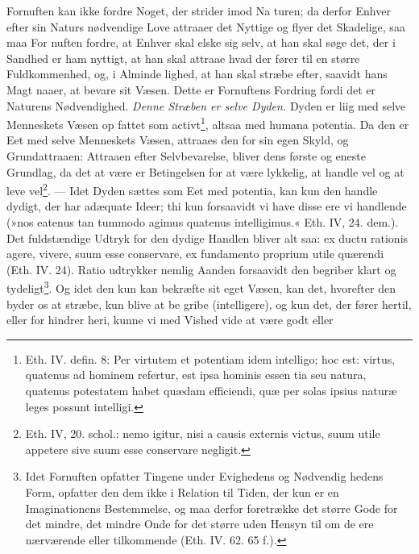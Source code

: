\documentclass[12pt,a4paper]{book}
\newcommand{\opage}[1]{\marginnote{\footnotesize\textit{[#1]}}}
\begin{document}
Fornuften kan ikke fordre Noget, der strider imod Na\-%
turen; da derfor Enhver efter sin Naturs nødvendige Love
attraaer det Nyttige og flyer det Skadelige, saa maa For\-%
nuften fordre, at Enhver skal elske sig selv, at han skal
søge det, der i Sandhed er ham nyttigt, at han skal attraae
hvad der fører til en større Fuldkommenhed, og, i Alminde\-%
lighed, at han skal stræbe efter, saavidt hans Magt naaer,
at bevare sit Væsen. Dette er Fornuftens Fordring fordi
det er Naturens Nødvendighed. \emph{Denne Stræben er selve
Dyden.} Dyden er liig med selve Menneskets Væsen op\-%
fattet som activt\footnote{Eth. IV. defin. 8: Per virtutem et potentiam idem intelligo; hoc
est: virtus, quatenus ad hominem refertur, est ipsa hominis essen\-%
tia seu natura, quatenus potestatem habet quædam efficiendi, quæ
per solas ipsius naturæ leges possunt intelligi.}, altsaa med humana potentia. Da den
er Eet med selve Menneskets Væsen, attraaes den for sin
egen Skyld, og Grundattraaen: Attraaen efter Selvbevarelse,
bliver dens første og eneste Grundlag, da det at være er
Betingelsen for at være lykkelig, at handle vel og at leve
vel\footnote{Eth. IV, 20. schol.: nemo igitur, nisi a causis externis victus, suum
utile appetere sive suum esse conservare negligit.}. --- Idet Dyden sættes som Eet med potentia, kan
\opage{125} \setcounter{footnote}{0}%
kun den handle dydigt, der har adæquate Ideer; thi kun
forsaavidt vi have disse ere vi handlende (»nos eatenus tan\-%
tummodo agimus quatenus intelligimus.« Eth. IV, 24. dem.).
Det fuldstændige Udtryk for den dydige Handlen bliver alt\-%
saa: ex ductu rationis agere, vivere, suum esse conservare,
ex fundamento proprium utile quærendi (Eth. IV. 24). Ratio
udtrykker nemlig Aanden forsaavidt den begriber klart og
tydeligt\footnote{Idet Fornuften opfatter Tingene under Evighedens og Nødvendig\-%
hedens Form, opfatter den dem ikke i Relation til Tiden, der kun
er en Imaginationens Bestemmelse, og maa derfor foretrække det
større Gode for det mindre, det mindre Onde for det større uden
Hensyn til om de ere nærværende eller tilkommende (Eth. IV.
62. 65 f.).}. Og idet den kun kan bekræfte sit eget Væsen,
kan det, hvorefter den byder os at stræbe, kun blive at be\-%
gribe (intelligere), og kun det, der fører hertil, eller for\-%
hindrer heri, kunne vi med Vished vide at være godt eller
\end{document}
